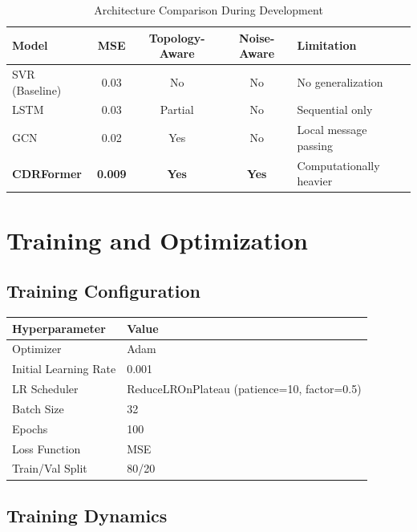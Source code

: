 \documentclass[11pt, a4paper]{article}
\begin{document}
\begin{table}[H]
\centering
\caption{Architecture Comparison During Development}
\begin{tabular}{@{}lcccp{4cm}@{}}
\toprule
\textbf{Model} & \textbf{MSE} & \textbf{Topology-Aware} & \textbf{Noise-Aware} & \textbf{Limitation} \\ \midrule
SVR (Baseline) & 0.03 & No & No & No generalization \\
LSTM & 0.03 & Partial & No & Sequential only \\
GCN & 0.02 & Yes & No & Local message passing \\
\textbf{CDRFormer} & \textbf{0.009} & \textbf{Yes} & \textbf{Yes} & Computationally heavier \\
\bottomrule
\end{tabular}
\end{table}

\section{Training and Optimization}

\subsection{Training Configuration}

\begin{table}[H]
\centering
\begin{tabular}{@{}ll@{}}
\toprule
\textbf{Hyperparameter} & \textbf{Value} \\ \midrule
Optimizer & Adam \\
Initial Learning Rate & 0.001 \\
LR Scheduler & ReduceLROnPlateau (patience=10, factor=0.5) \\
Batch Size & 32 \\
Epochs & 100 \\
Loss Function & MSE \\
Train/Val Split & 80/20 \\
\bottomrule
\end{tabular}
\end{table}

\subsection{Training Dynamics}
\end{document}
